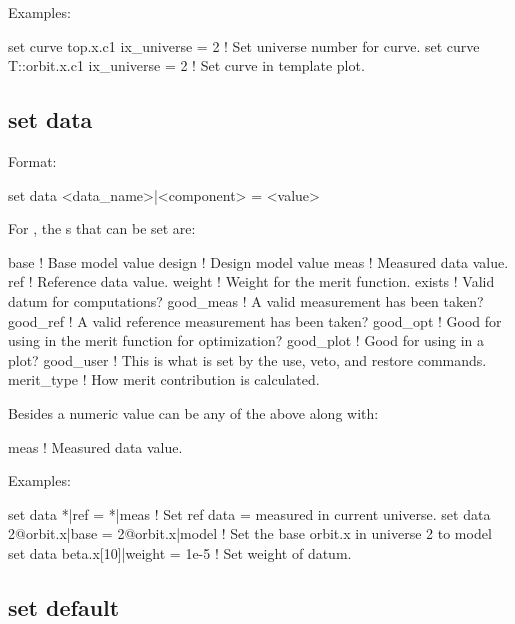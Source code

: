 {{Examples:
\begin{example}
  set curve top.x.c1 ix_universe = 2       ! Set universe number for curve.
  set curve T::orbit.x.c1 ix_universe = 2  ! Set curve in template plot.
\end{example}


\subsection{set data}
\label{s:set.data}

Format:
\begin{example}
  set data <data_name>|<component> = <value>
\end{example}


For , the s that can be set are:
\begin{example}
  base        ! Base model value
  design      ! Design model value
  meas        ! Measured data value.
  ref         ! Reference data value.
  weight      ! Weight for the merit function.
  exists      ! Valid datum for computations?
  good_meas   ! A valid measurement has been taken?
  good_ref    ! A valid reference measurement has been taken?
  good_opt    ! Good for using in the merit function for optimization?
  good_plot   ! Good for using in a plot?
  good_user   ! This is what is set by the use, veto, and restore commands.
  merit_type  ! How merit contribution is calculated.
\end{example}
Besides a numeric value  can be any of the above along with:
\begin{example}
  meas        ! Measured data value.
\end{example}

Examples:
\begin{example}
  set data *|ref = *|meas            ! Set ref data = measured in current universe.
  set data 2@orbit.x|base = 2@orbit.x|model 
                                     ! Set the base orbit.x in universe 2 to model
  set data beta.x[10]|weight = 1e-5  ! Set weight of datum.
\end{example}


\subsection{set default}
\label{s:set.default}

}}
